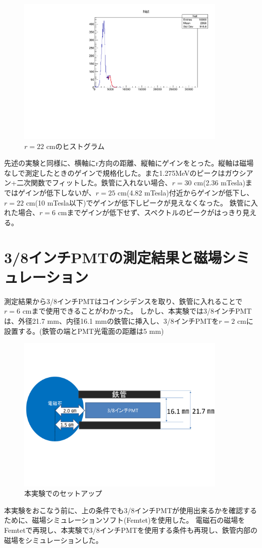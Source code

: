 \begin{figure}[H]
	\centering
		\includegraphics[angle=-90,width=10cm]{fig/iguchi/minicoout22.pdf}
	\caption{$r=22$ cmのヒストグラム}
	\label{histminicoout22}
\end{figure}
先述の実験と同様に、横軸にr方向の距離、縦軸にゲインをとった。縦軸は磁場なしで測定したときのゲインで規格化した。また1.275MeVのピークはガウシアン+二次関数でフィットした。鉄管に入れない場合、$r=30$ cm(2.36 mTesla)まではゲインが低下しないが、$r=25$ cm(4.82 mTesla)付近からゲインが低下し、$r=22$ cm(10 mTesla以下)でゲインが低下しピークが見えなくなった。
鉄管に入れた場合、$r=6$ cmまでゲインが低下せず、スペクトルのピークがはっきり見える。


\section{3/8インチPMTの測定結果と磁場シミュレーション}
測定結果から3/8インチPMTはコインシデンスを取り、鉄管に入れることで$r=6$ cmまで使用できることがわかった。
しかし、本実験では3/8インチPMTは、外径21.7 mm、内径16.1 mmの鉄管に挿入し、3/8インチPMTを$r=2$ cmに設置する。(鉄管の端とPMT光電面の距離は5 mm)
\begin{figure}[H]
	\centering
		\includegraphics[width=10cm]{fig/iguchi/honjikken.pdf}
	\caption{本実験でのセットアップ}
	\label{honjikken}
\end{figure}
本実験をおこなう前に、上の条件でも3/8インチPMTが使用出来るかを確認するために、磁場シミュレーションソフト(Femtet)を使用した。
電磁石の磁場をFemtetで再現し、本実験で3/8インチPMTを使用する条件も再現し、鉄管内部の磁場をシミュレーションした。

